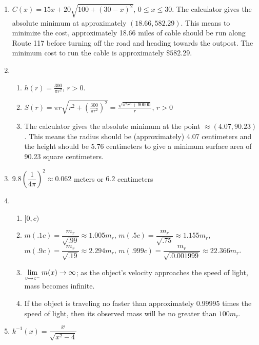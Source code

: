 \begin{enumerate}
\setcounter{enumi}{\value{HW}}

\item $C(x) = 15x+20\sqrt{100+(30-x)^2}$, $0 \leq x \leq 30$.  The calculator gives the absolute minimum at approximately $(18.66, 582.29)$.  This means to minimize the cost, approximately 18.66 miles of cable should be run along Route 117 before turning off the road and heading towards the outpost.  The minimum cost to run the cable is approximately $\$582.29$.



\item 

\begin{enumerate}
\item  $h(r) = \frac{300}{\pi r^2}$, $r > 0$.
\item  $S(r) = \pi r \sqrt{r^2+\left(\frac{300}{\pi r^2}\right)^2} = \frac{\sqrt{\pi^2 r^6+90000}}{r}$, $r>0$
\item  The calculator gives the absolute minimum at the point $\approx (4.07, 90.23)$.  This means the radius should be (approximately) 4.07 centimeters and the height should be 5.76 centimeters to give a minimum surface area of 90.23 square centimeters.


\end{enumerate}


\item $9.8 \left(\dfrac{1}{4\pi}\right)^{2} \approx 0.062$ meters or $6.2$ centimeters

\item \begin{enumerate}

\item $[0, c)$

\item $m(.1c) = \dfrac{m_{r}}{\sqrt{.99}} \approx 1.005m_{r}$,  $m(.5c) = \dfrac{m_{r}}{\sqrt{.75}} \approx 1.155m_{r}$,  $m(.9c) = \dfrac{m_{r}}{\sqrt{.19}} \approx 2.294m_{r}$, $m(.999c) = \dfrac{m_{r}}{\sqrt{.0.001999}} \approx 22.366m_{r}$.

\item $\displaystyle{\lim_{v \rightarrow c^{-}} m(x) \rightarrow \infty}$;   as the object's velocity approaches the speed of light, mass becomes infinite.

\item If the object is traveling no faster than approximately $0.99995$ times the speed of light, then its observed mass will be no greater than $100m_{r}$.

\end{enumerate}


\item $k^{-1}(x) = \dfrac{x}{\sqrt{x^{2} - 4}}$



\end{enumerate}
